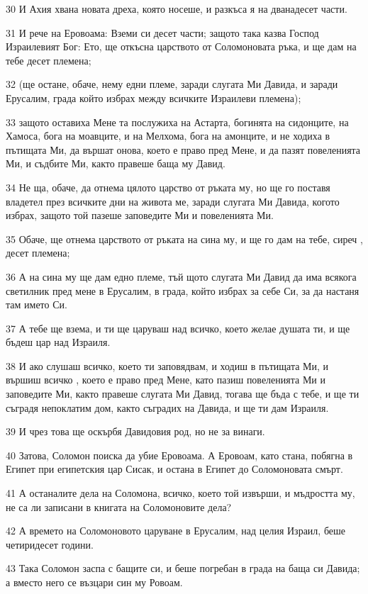 \par 30 И Ахия хвана новата дреха, която носеше, и разкъса я на дванадесет части.
\par 31 И рече на Еровоама: Вземи си десет части; защото така казва Господ Израилевият Бог: Ето, ще откъсна царството от Соломоновата ръка, и ще дам на тебе десет племена;
\par 32 (ще остане, обаче, нему едни племе, заради слугата Ми Давида, и заради Ерусалим, града който избрах между всичките Израилеви племена);
\par 33 защото оставиха Мене та послужиха на Астарта, богинята на сидонците, на Хамоса, бога на моавците, и на Мелхома, бога на амонците, и не ходиха в пътищата Ми, да вършат онова, което е право пред Мене, и да пазят повеленията Ми, и съдбите Ми, както правеше баща му Давид.
\par 34 Не ща, обаче, да отнема цялото царство от ръката му, но ще го поставя владетел през всичките дни на живота ме, заради слугата Ми Давида, когото избрах, защото той пазеше заповедите Ми и повеленията Ми.
\par 35 Обаче, ще отнема царството от ръката на сина му, и ще го дам на тебе, сиреч , десет племена;
\par 36 А на сина му ще дам едно племе, тъй щото слугата Ми Давид да има всякога светилник пред мене в Ерусалим, в града, който избрах за себе Си, за да настаня там името Си.
\par 37 А тебе ще взема, и ти ще царуваш над всичко, което желае душата ти, и ще бъдеш цар над Израиля.
\par 38 И ако слушаш всичко, което ти заповядвам, и ходиш в пътищата Ми, и вършиш всичко , което е право пред Мене, като пазиш повеленията Ми и заповедите Ми, както правеше слугата Ми Давид, тогава ще бъда с тебе, и ще ти съградя непоклатим дом, както съградих на Давида, и ще ти дам Израиля.
\par 39 И чрез това ще оскърбя Давидовия род, но не за винаги.
\par 40 Затова, Соломон поиска да убие Еровоама. А Еровоам, като стана, побягна в Египет при египетския цар Сисак, и остана в Египет до Соломоновата смърт.
\par 41 А останалите дела на Соломона, всичко, което той извърши, и мъдростта му, не са ли записани в книгата на Соломоновите дела?
\par 42 А времето на Соломоновото царуване в Ерусалим, над целия Израил, беше четиридесет години.
\par 43 Така Соломон заспа с бащите си, и беше погребан в града на баща си Давида; а вместо него се възцари син му Ровоам.

